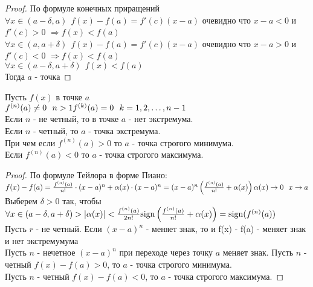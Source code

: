 \begin{proof}
  По формуле конечных приращений\\
  $\forall x \in (a - \delta, a) ~~ f(x) - f(a) = f'(c)(x - a)$ очевидно что
  $x - a < 0$ и \\ $f'(c) > 0$ $\Rightarrow f(x) < f(a)$\\
  $\forall x \in (a, a + \delta) ~~ f(x) - f(a) = f'(c)(x - a)$ очевидно что
  $x - a > 0$ и \\ $f'(c) < 0$ $\Rightarrow f(x) < f(a)$\\
  $\forall x \in (a - \delta, a+ \delta) ~~ f(x) < f(a)$\\
  Тогда $a$ - точка 
\end{proof}

\begin{theorem}
  Пусть $f(x)$ в точке $a$\\
  $f^{(n)} (a) \neq 0 ~~ n > 1\\
  f^{(k)} (a) = 0 ~~ k = 1, 2, \ldots, n-1$\\
  Если $n$ - не четный, то в точке $a$ - нет экстремума.\\
  Если $n$ - четный, то $a$ - точка экстремума.\\
  При чем если $f^{(n)} (a) > 0$ то $a$ - точка строгого минимума.\\
  Если  $f^{(n)} (a) < 0$ то $a$ - точка строгого максимума.
\end{theorem}

\begin{proof}
  По формуле Тейлора в форме Пиано:\\
  $f(x) - f(a) = \frac{f^{(n)}(a)}{n!} \cdot (x - a)^n + \alpha (x)
  \cdot (x - a)^n = (x - a)^n \left(\frac{f^{(n)}(a)}{n!} + \alpha(x) \right)\\
  \alpha (x) \to 0 ~~ x \to a$ \\
  Выберем $\delta > 0$ так, чтобы $\forall x \in
  (a - \delta, a + \delta) > |\alpha(x)| < \frac{f^{(n)}(a)}{2n!}\\
  \mathrm{sign} \left(\frac{f^{(n)}(a)}{n!} + \alpha(x)\right) = \mathrm{sign} (f^{(n)}(a))$\\
  Пусть $r$ - не четный. Если $(x - a)^n$ - меняет знак, то и
  f(x) - f(a) - меняет знак и нет экстремумума\\
  Пусть $n$ - нечетное $(x-a)^n$ при переходе через точку $a$ меняет знак.
  Пусть $n$ - четный $f(x) - f(a) > 0$, то $a$ - точка строгого минимума.\\
  Пусть $n$ - четный $f(x) - f(a) < 0$, то $a$ - точка строгого максимума.
\end{proof}

